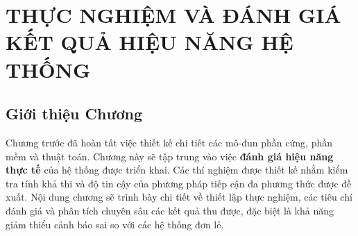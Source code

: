\chapter[KẾT QUẢ VÀ THỰC NGHIỆM]{THỰC NGHIỆM VÀ ĐÁNH GIÁ KẾT QUẢ HIỆU NĂNG HỆ THỐNG}
\label{chap:results} %

\section*{Giới thiệu Chương} %
Chương trước đã hoàn tất việc thiết kế chi tiết các mô-đun phần cứng, phần mềm và thuật toán. Chương này sẽ tập trung vào việc \textbf{đánh giá hiệu năng thực tế} của hệ thống được triển khai. Các thí nghiệm được thiết kế nhằm kiểm tra tính khả thi và độ tin cậy của phương pháp tiếp cận đa phương thức được đề xuất. Nội dung chương sẽ trình bày chi tiết về thiết lập thực nghiệm, các tiêu chí đánh giá và phân tích chuyên sâu các kết quả thu được, đặc biệt là khả năng giảm thiểu cảnh báo sai so với các hệ thống đơn lẻ.

